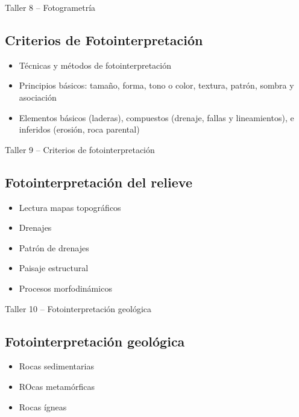\documentclass[a4paper,twoside,11pt,]{article}
\begin{document}
\begin{tcolorbox}[enhanced,width=5in,center upper,  fontupper=\large\bfseries,drop shadow southwest,sharp corners]
Taller 8 -- Fotogrametría
\end{tcolorbox}

\subsection {Criterios de Fotointerpretación}
\begin{itemize}
\item Técnicas y métodos de fotointerpretación 
\item Principios básicos: tamaño, forma, tono o color, textura, patrón, sombra y asociación
\item Elementos básicos (laderas), compuestos (drenaje, fallas y lineamientos), e inferidos (erosión, roca parental)
\end{itemize}

\begin{tcolorbox}[enhanced,width=5in,center upper,  fontupper=\large\bfseries,drop shadow southwest,sharp corners]
Taller 9 -- Criterios de fotointerpretación
\end{tcolorbox}

\subsection {Fotointerpretación del relieve}
\begin{itemize}
    \item Lectura mapas topográficos
    \item Drenajes
    \item Patrón de drenajes
    \item Paisaje estructural
    \item Procesos morfodinámicos
\end{itemize}

\begin{tcolorbox}[enhanced,width=5in,center upper,  fontupper=\large\bfseries,drop shadow southwest,sharp corners]
Taller 10 -- Fotointerpretación geológica
\end{tcolorbox}

\subsection {Fotointerpretación geológica}
\begin{itemize}
\item Rocas sedimentarias
\item ROcas metamórficas
\item Rocas ígneas
\end{itemize}
\end{document}
